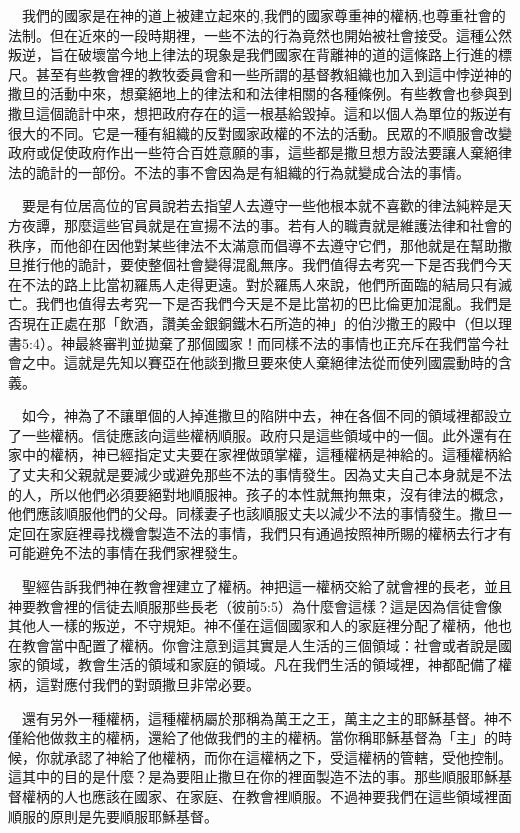 \documentclass{book}
\begin{document}
　我們的國家是在神的道上被建立起來的,我們的國家尊重神的權柄,也尊重社會的法制。但在近來的一段時期裡，一些不法的行為竟然也開始被社會接受。這種公然叛逆，旨在破壞當今地上律法的現象是我們國家在背離神的道的這條路上行進的標尺。甚至有些教會裡的教牧委員會和一些所謂的基督教組織也加入到這中悖逆神的撒旦的活動中來，想棄絕地上的律法和和法律相關的各種條例。有些教會也參與到撒旦這個詭計中來，想把政府存在的這一根基給毀掉。這和以個人為單位的叛逆有很大的不同。它是一種有組織的反對國家政權的不法的活動。民眾的不順服會改變政府或促使政府作出一些符合百姓意願的事，這些都是撒旦想方設法要讓人棄絕律法的詭計的一部份。不法的事不會因為是有組織的行為就變成合法的事情。

　要是有位居高位的官員說若去指望人去遵守一些他根本就不喜歡的律法純粹是天方夜譚，那麼這些官員就是在宣揚不法的事。若有人的職責就是維護法律和社會的秩序，而他卻在因他對某些律法不太滿意而倡導不去遵守它們，那他就是在幫助撒旦推行他的詭計，要使整個社會變得混亂無序。我們值得去考究一下是否我們今天在不法的路上比當初羅馬人走得更遠。對於羅馬人來說，他們所面臨的結局只有滅亡。我們也值得去考究一下是否我們今天是不是比當初的巴比倫更加混亂。我們是否現在正處在那「飲酒，讚美金銀銅鐵木石所造的神」的伯沙撒王的殿中（但以理書5:4）。神最終審判並拋棄了那個國家！而同樣不法的事情也正充斥在我們當今社會之中。這就是先知以賽亞在他談到撒旦要來使人棄絕律法從而使列國震動時的含義。

　如今，神為了不讓單個的人掉進撒旦的陷阱中去，神在各個不同的領域裡都設立了一些權柄。信徒應該向這些權柄順服。政府只是這些領域中的一個。此外還有在家中的權柄，神已經指定丈夫要在家裡做頭掌權，這種權柄是神給的。這種權柄給了丈夫和父親就是要減少或避免那些不法的事情發生。因為丈夫自己本身就是不法的人，所以他們必須要絕對地順服神。孩子的本性就無拘無束，沒有律法的概念，他們應該順服他們的父母。同樣妻子也該順服丈夫以減少不法的事情發生。撒旦一定回在家庭裡尋找機會製造不法的事情，我們只有通過按照神所賜的權柄去行才有可能避免不法的事情在我們家裡發生。

　聖經告訴我們神在教會裡建立了權柄。神把這一權柄交給了就會裡的長老，並且神要教會裡的信徒去順服那些長老（彼前5:5）為什麼會這樣？這是因為信徒會像其他人一樣的叛逆，不守規矩。神不僅在這個國家和人的家庭裡分配了權柄，他也在教會當中配置了權柄。你會注意到這其實是人生活的三個領域：社會或者說是國家的領域，教會生活的領域和家庭的領域。凡在我們生活的領域裡，神都配備了權柄，這對應付我們的對頭撒旦非常必要。

　還有另外一種權柄，這種權柄屬於那稱為萬王之王，萬主之主的耶穌基督。神不僅給他做救主的權柄，還給了他做我們的主的權柄。當你稱耶穌基督為「主」的時候，你就承認了神給了他權柄，而你在這權柄之下，受這權柄的管轄，受他控制。這其中的目的是什麼？是為要阻止撒旦在你的裡面製造不法的事。那些順服耶穌基督權柄的人也應該在國家、在家庭、在教會裡順服。不過神要我們在這些領域裡面順服的原則是先要順服耶穌基督。
\end{document}
